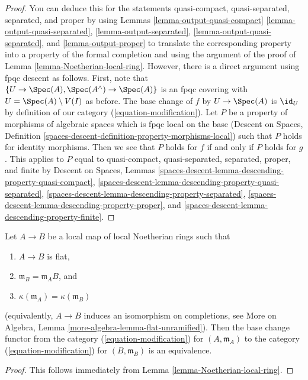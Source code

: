 \begin{proof}
You can deduce this for the statements
quasi-compact, quasi-separated, separated, and proper
by using Lemmas \ref{lemma-output-quasi-compact}
\ref{lemma-output-quasi-separated},
\ref{lemma-output-separated},
\ref{lemma-output-quasi-separated}, and
\ref{lemma-output-proper}
to translate the corresponding property into a property
of the formal completion and using the argument of the proof
of Lemma \ref{lemma-Noetherian-local-ring}.
However, there is a direct argument using fpqc descent as follows.
First, note that $\{U \to \Spec(A), \Spec(A^\wedge) \to \Spec(A)\}$ is an
fpqc covering with $U = \Spec(A) \setminus V(I)$ as before.
The base change of $f$ by $U \to \Spec(A)$ is $\id_U$
by definition of our category (\ref{equation-modification}).
Let $P$ be a property of morphisms of algebraic spaces which
is fpqc local on the base (Descent on Spaces, Definition
\ref{spaces-descent-definition-property-morphisms-local})
such that $P$ holds for identity morphisms.
Then we see that $P$ holds for $f$ if and only if $P$ holds for $g$.
This applies to $P$ equal to
quasi-compact, quasi-separated, separated, proper, and finite
by
Descent on Spaces, Lemmas
\ref{spaces-descent-lemma-descending-property-quasi-compact},
\ref{spaces-descent-lemma-descending-property-quasi-separated},
\ref{spaces-descent-lemma-descending-property-separated},
\ref{spaces-descent-lemma-descending-property-proper}, and
\ref{spaces-descent-lemma-descending-property-finite}.
\end{proof}

\begin{lemma}
\label{lemma-equivalence-to-completion}
Let $A \to B$ be a local map of local Noetherian rings such that
\begin{enumerate}
\item $A \to B$ is flat,
\item $\mathfrak m_B = \mathfrak m_A B$, and
\item $\kappa(\mathfrak m_A) = \kappa(\mathfrak m_B)$
\end{enumerate}
(equivalently, $A \to B$ induces an isomorphism on completions, see
More on Algebra, Lemma \ref{more-algebra-lemma-flat-unramified}).
Then the base change functor from the category
(\ref{equation-modification}) for $(A, \mathfrak m_A)$ to the category
(\ref{equation-modification}) for $(B, \mathfrak m_B)$
is an equivalence.
\end{lemma}

\begin{proof}
This follows immediately from Lemma \ref{lemma-Noetherian-local-ring}.
\end{proof}

